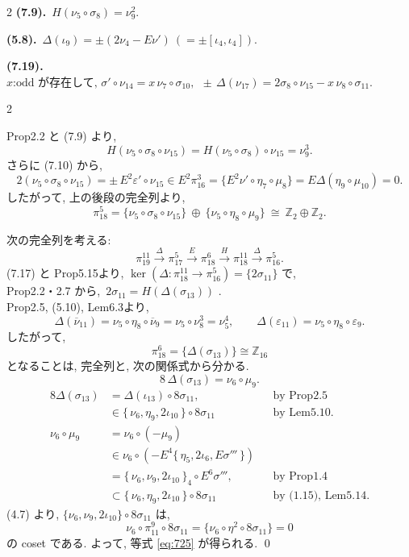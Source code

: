 \documentclass[10pt, leqno]{ltjsarticle}
\newcommand{\toda}[1]{\{\,#1\,\}}              %
\newcommand{\todai}[2][]{\{\,#2\,\}_{#1}}      %
\newcommand{\gen}[1]{\{#1\}}       %
\newcommand{\pit}[2]{\pi_{#1}^{#2}}
\numberwithin{equation}{section}
\theoremstyle{plain}
\theoremstyle{definition}
\theoremstyle{remark}
\begin{document}
\begin{paracol}{2}
\noindent
\textbf{(7.9).}\
\(H(\nu_5\circ\sigma_8) = \nu_9^2 .\)

\noindent
\textbf{(5.8).}\
\(\Delta(\iota_9)=\pm(2\nu_4-E\nu')  \ (=\pm[\iota_4, \iota_4]) .\)

\noindent
\textbf{(7.19).}\
\(x \text{:odd が存在して, }
\sigma'\circ \nu_{14}=x\,\nu_{7}\circ\sigma_{10},\ \
\pm\,\Delta(\nu_{17})=2\sigma_{8}\circ \nu_{15}-x\,\nu_{8}\circ\sigma_{11} .\)








\end{paracol}

\begin{paracol}{2}

Prop2.2 と (7.9) より, 
\[
H(\nu_5\circ\sigma_8\circ\nu_{15})=H(\nu_5\circ\sigma_8)\circ\nu_{15}=\nu_9^{3}.
\]
さらに (7.10) から,
\[
2(\nu_5\circ\sigma_8\circ\nu_{15})
= \pm\,E^{2}\varepsilon'\circ\nu_{15} \in E^{2}\pi_{16}^{3}
= \gen{E^2\nu'\circ\eta_7\circ\mu_8}
= E\Delta(\eta_9\circ\mu_{10})=0 .
\]
したがって, 上の後段の完全列より,
\[
\pi_{18}^{5}
 = \gen{\nu_5\circ\sigma_8\circ\nu_{15}}\ \oplus\ \gen{\nu_5\circ\eta_8\circ\mu_9}
 \ \cong\ \mathbb{Z}_2\oplus\mathbb{Z}_2 .
\]

次の完全列を考える:
\[
\pi_{19}^{11}\xrightarrow{\ \Delta\ }\pi_{17}^{5}\xrightarrow{\ E\ }\pi_{18}^{6}
\xrightarrow{\ H\ }\pi_{18}^{11}\xrightarrow{\ \Delta\ }\pi_{16}^{5}.
\]
(7.17) と Prop5.15より, 
\(\ker(\Delta:\pi_{18}^{11}\to\pi_{16}^{5}) = \gen{2\sigma_{11}}\) 
で, \\
Prop2.2・2.7 から,
\(\,2\sigma_{11}=H(\Delta(\sigma_{13}))\) .\\
Prop2.5, (5.10), Lem6.3より,
\[
\Delta(\overline{\nu}_{11})
=\nu_5\circ\eta_8\circ\overline{\nu}_9
= \nu_5\circ\nu_8^{3}=\nu_5^4,
\qquad
\Delta(\varepsilon_{11})=\nu_5\circ\eta_8\circ\varepsilon_9 .
\]
したがって,
\[
\pi_{18}^{6}=\gen{\Delta(\sigma_{13})}\cong\mathbb{Z}_{16}
\]
となることは, 完全列と, 次の関係式から分かる.
\begin{equation}\label{eq:725}
8\,\Delta(\sigma_{13})=\nu_6\circ\mu_9 .
\end{equation}
\noindent \because
\[
\begin{align*}
8\Delta(\sigma_{13})
& = \Delta(\iota_{13})\circ 8\sigma_{11},
&& \text{by Prop2.5}\\
& \in \toda{\nu_6, \eta_9, 2\iota_{10}}\circ8\sigma_{11}
&& \text{by Lem5.10}.  \\
\nu_6\circ\mu_9
& = \nu_6\circ(-\mu_9)\\
& \in \nu_6\circ(-E^4\toda{\eta_5,2\iota_6,E\sigma'''})\\
& = \todai[4]{\nu_6,\nu_9,2\iota_{10}}\circ E^6\sigma''',
&& \text{by Prop1.4}\\
& \subset \toda{\nu_6, \eta_9, 2\iota_{10}} \circ 8\sigma_{11}
&& \text{by (1.15), Lem5.14.}
\end{align*}
\]
(4.7) より,
\(\gen{\nu_6,\nu_9,2\iota_{10}}\circ 8\sigma_{11}\) は, 
\[
\nu_6\circ\pit{11}{9} \circ8\sigma_{11}
= \gen{\nu_6 \circ \eta^{2} \circ 8\sigma_{11}}=0
\]
の coset である. 
よって, 等式 \eqref{eq:725} が得られる. 
\qed


\end{paracol}
\end{document}
